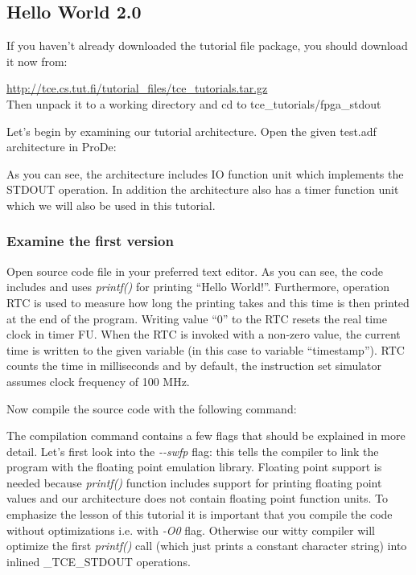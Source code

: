 \documentclass[twoside]{tceusermanual}
\begin{document}
\subsection{Hello World 2.0}

If you haven't already downloaded the tutorial file package, you should
download it now from:

\url{http://tce.cs.tut.fi/tutorial_files/tce_tutorials.tar.gz}\\

Then unpack it to a working directory and cd to tce\_tutorials/fpga\_stdout

Let's begin by examining our tutorial architecture. Open the given test.adf
architecture in ProDe:


As you can see, the architecture includes IO function unit which implements the
STDOUT operation. In addition the architecture also has a timer function unit
which we will also be used in this tutorial.

\subsubsection{Examine the first version}

Open source code file  in your preferred text
editor. As you can see, the code includes  and uses
\textit{printf()} for printing ``Hello World!''. Furthermore,
operation RTC is used to measure how long the printing takes and this
time is then printed at the end of the program. Writing value ``0'' to
the RTC resets the real time clock in timer FU. When the RTC is
invoked with a non-zero value, the current time is written to the
given variable (in this case to variable ``timestamp''). RTC counts
the time in milliseconds and by default, the instruction set simulator
assumes clock frequency of 100 MHz.

Now compile the source code with the following command:


The compilation command contains a few flags that should be explained
in more detail. Let's first look into the \textit{-{}-swfp} flag: this
tells the compiler to link the program with the floating point
emulation library. Floating point support is needed because
\textit{printf()} function includes support for printing floating
point values and our architecture does not contain floating point
function units. To emphasize the lesson of this tutorial it is
important that you compile the code without optimizations i.e. with
\textit{-O0} flag. Otherwise our witty compiler will optimize the
first \textit{printf()} call (which just prints a constant character
string) into inlined \_TCE\_STDOUT operations.
\end{document}
